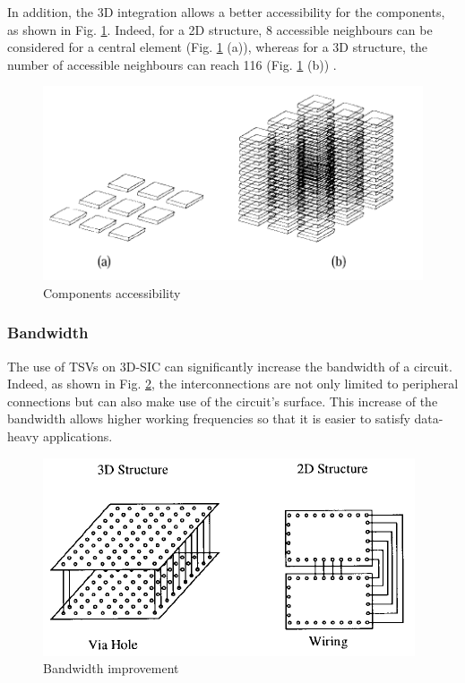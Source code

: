 In addition, the 3D integration allows a better accessibility for the components, as shown in Fig. \ref{fig:accessibility}. Indeed, for a 2D structure, 8 accessible neighbours can be considered for a central element (Fig. \ref{fig:accessibility} (a)), whereas for a 3D structure, the number of accessible neighbours can reach 116 (Fig. \ref{fig:accessibility} (b)) \cite{659500}.

\begin{figure}[h!]
\begin{center}
\includegraphics[width=0.75\linewidth]{accessibility.png}
\end{center}
\vspace{-0.5cm}
\caption{Components accessibility \cite{659500}}
\label{fig:accessibility}
\end{figure}

\subsubsection{Bandwidth}

The use of TSVs on 3D-SIC can significantly increase the bandwidth of a circuit. Indeed, as shown in Fig. \ref{fig:bandwidth}, the interconnections are not only limited to peripheral connections but can also make use of the circuit's surface. This increase of the bandwidth allows higher working frequencies so that it is easier to satisfy data-heavy applications.

\begin{figure}[h!]
\begin{center}
\includegraphics[width=0.75\linewidth]{bandwidth.png}
\end{center}
\vspace{-0.5cm}
\caption{Bandwidth improvement \cite{659500}}
\label{fig:bandwidth}
\end{figure}

